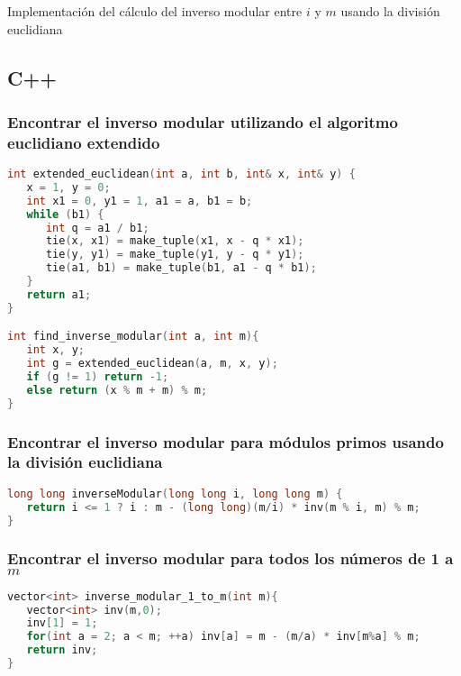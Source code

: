 Implementación del cálculo del inverso modular entre $i$ y $m$ usando la división euclidiana

\subsection{C++}

\subsubsection{Encontrar el inverso modular utilizando el algoritmo euclidiano extendido}
\begin{lstlisting}[language=C++]
int extended_euclidean(int a, int b, int& x, int& y) {
   x = 1, y = 0;
   int x1 = 0, y1 = 1, a1 = a, b1 = b;
   while (b1) {
      int q = a1 / b1;
      tie(x, x1) = make_tuple(x1, x - q * x1);
      tie(y, y1) = make_tuple(y1, y - q * y1);
      tie(a1, b1) = make_tuple(b1, a1 - q * b1);
   }
   return a1;
}

int find_inverse_modular(int a, int m){
   int x, y;
   int g = extended_euclidean(a, m, x, y);
   if (g != 1) return -1;
   else return (x % m + m) % m;
}
\end{lstlisting}


\subsubsection{Encontrar el inverso modular para módulos primos usando la división euclidiana}
\begin{lstlisting}[language=C++]
long long inverseModular(long long i, long long m) {
   return i <= 1 ? i : m - (long long)(m/i) * inv(m % i, m) % m;
}
\end{lstlisting}

\subsubsection{Encontrar el inverso modular para todos los números de 1 a $m$}
\begin{lstlisting}[language=C++]
vector<int> inverse_modular_1_to_m(int m){
   vector<int> inv(m,0);
   inv[1] = 1;
   for(int a = 2; a < m; ++a) inv[a] = m - (m/a) * inv[m%a] % m;
   return inv;
}
\end{lstlisting}


